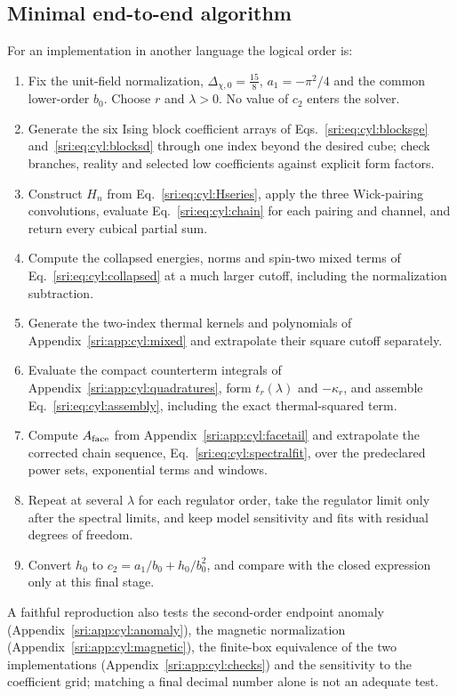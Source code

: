 \subsection{Minimal end-to-end algorithm}\label{sri:app:cyl:algorithm}
For an implementation in another language the logical order is:
\begin{enumerate}[leftmargin=2em]
\item Fix the unit-field normalization, $\Delta_{\chi,0}=\frac{15}8$, $a_1=-\pi^2/4$ and the common lower-order $b_0$.
 Choose $r$ and $\lambda>0$. No value of $c_2$ enters the solver.
\item Generate the six Ising block coefficient arrays of Eqs.~\eqref{sri:eq:cyl:blocksge} and~\eqref{sri:eq:cyl:blocksd} through
 one index beyond the desired cube; check branches, reality and selected low coefficients against explicit form
 factors.
\item Construct $H_n$ from Eq.~\eqref{sri:eq:cyl:Hseries}, apply the three Wick-pairing convolutions, evaluate
 Eq.~\eqref{sri:eq:cyl:chain} for each pairing and channel, and return every cubical partial sum.
\item Compute the collapsed energies, norms and spin-two mixed terms of Eq.~\eqref{sri:eq:cyl:collapsed} at a much larger
 cutoff, including the normalization subtraction.
\item Generate the two-index thermal kernels and polynomials of Appendix~\ref{sri:app:cyl:mixed} and extrapolate their square
 cutoff separately.
\item Evaluate the compact counterterm integrals of Appendix~\ref{sri:app:cyl:quadratures}, form $t_r(\lambda)$ and
 $-\kappa_r$, and assemble Eq.~\eqref{sri:eq:cyl:assembly}, including the exact thermal-squared term.
\item Compute $A_{\rm face}$ from Appendix~\ref{sri:app:cyl:facetail} and extrapolate the corrected chain sequence,
 Eq.~\eqref{sri:eq:cyl:spectralfit}, over the predeclared power sets, exponential terms and windows.
\item Repeat at several $\lambda$ for each regulator order, take the regulator limit only after the spectral limits,
 and keep model sensitivity and fits with residual degrees of freedom.
\item Convert $h_0$ to $c_2=a_1/b_0+h_0/b_0^2$, and compare with the closed expression only at this final stage.
\end{enumerate}
A faithful reproduction also tests the second-order endpoint anomaly (Appendix~\ref{sri:app:cyl:anomaly}), the magnetic
normalization (Appendix~\ref{sri:app:cyl:magnetic}), the finite-box equivalence of the two implementations
(Appendix~\ref{sri:app:cyl:checks}) and the sensitivity to the coefficient grid; matching a final decimal number alone is not an
adequate test.

